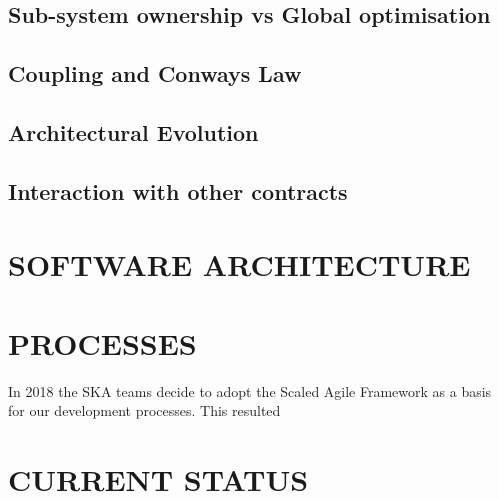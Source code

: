 \documentclass[a4paper,
               biblatex,     %
               keeplastbox,   %
               ]{jacow}
\begin{document}
\subsection{Sub-system ownership vs Global optimisation}
\subsection{Coupling and Conways Law}
\subsection{Architectural Evolution}
\subsection{Interaction with other contracts}

\section{SOFTWARE ARCHITECTURE}


\section{PROCESSES}
In 2018 the SKA teams decide to adopt the Scaled Agile Framework as a basis for our development processes. This resulted 


\section{CURRENT STATUS}

\end{document}
